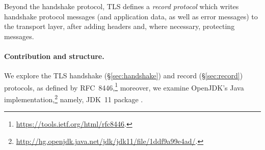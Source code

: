 Beyond the handshake protocol, TLS defines a \emph{record protocol} which 
writes handshake protocol messages (and application data, as well as 
error messages) to the transport layer, after adding headers and, where
necessary, protecting messages. 

\paragraph{Contribution and structure.}

We explore the TLS handshake (\S\ref{sec:handshake}) and record (\S\ref{sec:record})
protocols, as defined by RFC~8446,\footnote{\url{https://tools.ietf.org/html/rfc8446}.}
moreover, we examine OpenJDK's Java 
implementation,\footnote{\url{http://hg.openjdk.java.net/jdk/jdk11/file/1ddf9a99e4ad/}.} 
namely, JDK~11 package .

